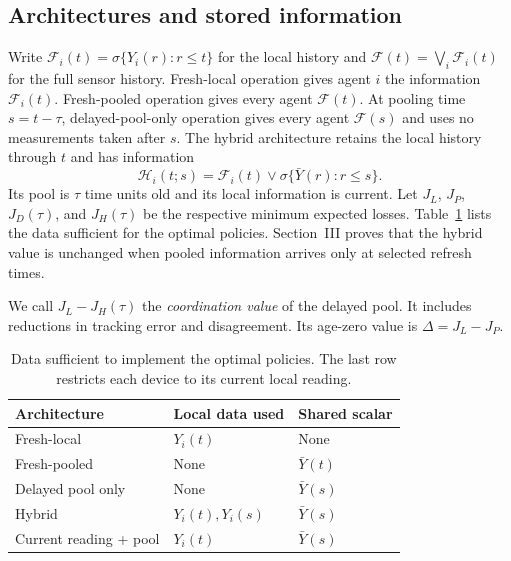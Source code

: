 \documentclass[letterpaper,10pt,conference]{ieeeconf}
\begin{document}
\subsection{Architectures and stored information}
Write $\mathcal F_i(t)=\sigma\{Y_i(r):r\le t\}$ for the local history and $\mathcal F(t)=\bigvee_i\mathcal F_i(t)$ for the full sensor history. Fresh-local operation gives agent $i$ the information $\mathcal F_i(t)$. Fresh-pooled operation gives every agent $\mathcal F(t)$. At pooling time $s=t-\tau$, delayed-pool-only operation gives every agent $\mathcal F(s)$ and uses no measurements taken after $s$. The hybrid architecture retains the local history through $t$ and has information
\begin{equation}
 \mathcal H_i(t;s)=\mathcal F_i(t)\vee
             \sigma\{\bar Y(r):r\le s\}.\label{eq:hybrid}
\end{equation}
Its pool is $\tau$ time units old and its local information is current. Let $J_L$, $J_P$, $J_D(\tau)$, and $J_H(\tau)$ be the respective minimum expected losses. Table~\ref{tab:information} lists the data sufficient for the optimal policies. Section~III proves that the hybrid value is unchanged when pooled information arrives only at selected refresh times.

We call $J_L-J_H(\tau)$ the \emph{coordination value} of the delayed pool. It includes reductions in tracking error and disagreement. Its age-zero value is $\Delta=J_L-J_P$.

\begin{table}[t]
\caption{Data sufficient to implement the optimal policies. The last row restricts each device to its current local reading.}
\label{tab:information}
\centering
\begin{tabular}{@{}lll@{}}
\toprule
Architecture & Local data used & Shared scalar \\
\midrule
Fresh-local & $Y_i(t)$ & None \\
Fresh-pooled & None & $\bar Y(t)$ \\
Delayed pool only & None & $\bar Y(s)$ \\
Hybrid & $Y_i(t),Y_i(s)$ & $\bar Y(s)$ \\
Current reading + pool & $Y_i(t)$ & $\bar Y(s)$ \\
\bottomrule
\end{tabular}
\end{table}
\end{document}
